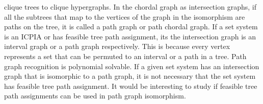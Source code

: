 \documentclass{llncs}
\def\cH{{\cal H}}
\def\F{{\mathcal F}}
\begin{document}
clique trees to clique hypergraphs\cite{km02}. In the chordal graph as
intersection graphs, if all the subtrees that map to the vertices of the
graph in the isomorphism 
are paths on the tree, it is called a path graph\cite{mcg04} or path
chordal graph.
If a set system is an ICPIA or has feasible tree path assignment, its
the intersection graph is an interval graph or a path graph
respectively. This is because every vertex represents a set that can be permuted to  an
interval or a path in a tree. Path graph recognition is polynomial
solvable\cite{gav78,aas93}. If a given set system has an intersection
graph that is isomorphic to a path graph, it is not necessary that the
set system has feasible tree path assignment. It would be interesting
to study if feasible tree path assignments can be used in path graph
isomorphism.






\end{document}
